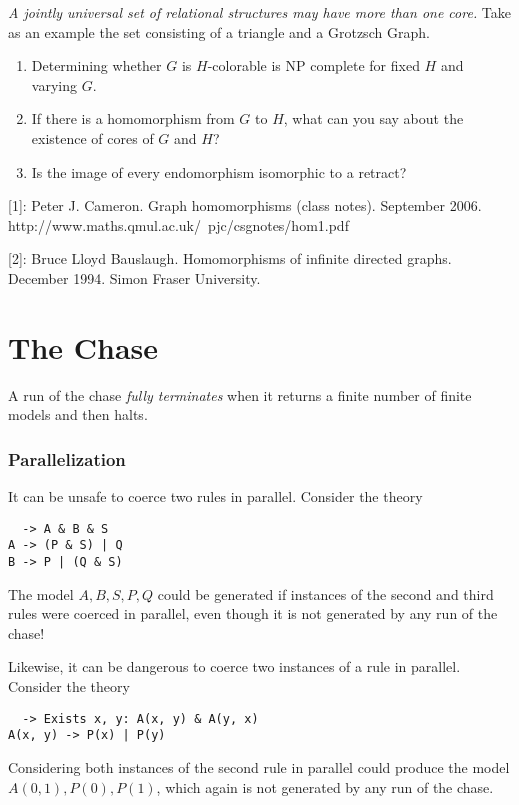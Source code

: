 \documentclass[12pt]{article}
\begin{document}
  \emph{A jointly universal set of relational structures may have more
    than one core.} Take as an example the set consisting of a
  triangle and a Grotzsch Graph.

  \begin{enumerate}
  \item Determining whether $G$ is $H$-colorable is NP complete for
    fixed $H$ and varying $G$.
  \item If there is a homomorphism from $G$ to $H$, what can you say
    about the existence of cores of $G$ and $H$?
  \item Is the image of every endomorphism isomorphic to a retract?
  \end{enumerate}

  [1]: Peter J. Cameron. Graph homomorphisms (class notes). September
  2006. http://www.maths.qmul.ac.uk/~pjc/csgnotes/hom1.pdf

  [2]: Bruce Lloyd Bauslaugh. Homomorphisms of infinite directed
  graphs. December 1994. Simon Fraser University.



\section{The Chase}

  A run of the chase \emph{fully terminates} when it returns a finite
  number of finite models and then halts.

\subsubsection{Parallelization}

  It can be unsafe to coerce two rules in parallel. Consider the
  theory
\begin{verbatim}
  -> A & B & S
A -> (P & S) | Q
B -> P | (Q & S)
\end{verbatim}
  The model ${A, B, S, P, Q}$ could be generated if instances of the
  second and third rules were coerced in parallel, even though it is
  not generated by any run of the chase!

  Likewise, it can be dangerous to coerce two instances of a rule in
  parallel. Consider the theory
\begin{verbatim}
  -> Exists x, y: A(x, y) & A(y, x)
A(x, y) -> P(x) | P(y)
\end{verbatim}
  Considering both instances of the second rule in parallel could
  produce the model ${A(0, 1), P(0), P(1)}$, which again is not
  generated by any run of the chase.
\end{document}
